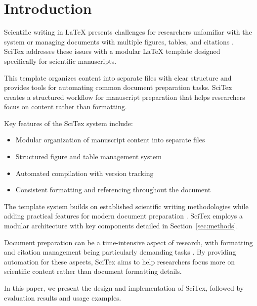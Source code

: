 
\section{Introduction}
\label{sec:introduction}

Scientific writing in LaTeX presents challenges for researchers unfamiliar with the system or managing documents with multiple figures, tables, and citations \cite{Smith2020}. SciTex addresses these issues with a modular LaTeX template designed specifically for scientific manuscripts.

This template organizes content into separate files with clear structure and provides tools for automating common document preparation tasks. SciTex creates a structured workflow for manuscript preparation that helps researchers focus on content rather than formatting.


Key features of the SciTex system include:

\begin{itemize}
    \item Modular organization of manuscript content into separate files
    \item Structured figure and table management system
    \item Automated compilation with version tracking
    \item Consistent formatting and referencing throughout the document
\end{itemize}

The template system builds on established scientific writing methodologies while adding practical features for modern document preparation \cite{Taylor2022}. SciTex employs a modular architecture with key components detailed in Section~\ref{sec:methods}.


Document preparation can be a time-intensive aspect of research, with formatting and citation management being particularly demanding tasks \cite{Lee2018}. By providing automation for these aspects, SciTex aims to help researchers focus more on scientific content rather than document formatting details.

In this paper, we present the design and implementation of SciTex, followed by evaluation results and usage examples.

